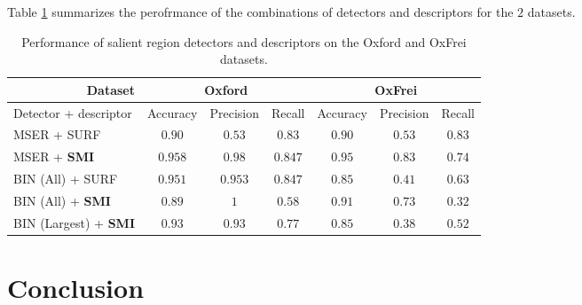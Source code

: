 \documentclass[a4paper,11pt]{article}
\begin{document}
\begin{comment}
\end{comment}

Table \ref{tab:perf} summarizes the perofrmance of the combinations of detectors and descriptors for the $2$ datasets.
\begin{table}[!ht]
\begin{center}
  \vspace{-6pt}
\begin{tabular}{|l|*{6}{c|}}  %
\hline
\multicolumn{1}{|r}{Dataset} & \multicolumn{3}{|c|}{Oxford}  & \multicolumn{3}{|c|}{OxFrei} \\ \hline
{Detector + descriptor}  & Accuracy &Precision &Recall & Accuracy &Precision &Recall \\ \hline
MSER + SURF & $0.90$ & $0.53$ & $0.83$ &  $0.90$ & $0.53$ & $0.83$\\ \hline
MSER + \bf{SMI}  &$0.958$  & $0.98$ & $0.847$ & $0.95$ &$0.83$ & $0.74$ \\ \hline
BIN (All) + SURF & $0.951$ & $0.953$ &$0.847$ & $0.85$ &$0.41$ & $0.63$\\ \hline
BIN (All) + \bf{SMI} & $0.89$  & $1$ &$0.58$ & $0.91$ &$0.73$ & $0.32$\\ \hline
BIN (Largest) + \bf{SMI} &$0.93$  & $0.93$ &$0.77$ & $0.85$ & $0.38$ & $0.52$\\ \hline
\end{tabular}
\end{center}
\vspace{-20pt}
\caption{Performance of salient region detectors and descriptors on the Oxford and OxFrei datasets.} \label{tab:perf}
  \vspace{-10pt}
\end{table}

\section{Conclusion}











\small



\end{document}
